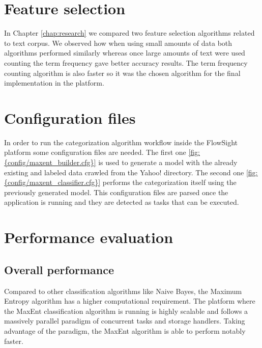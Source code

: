   

\section{Feature selection}
In Chapter \ref{chap:research} we compared two feature selection algorithms related to text corpus. We observed how when using small amounts of data both algorithms performed similarly whereas once
large amounts of text were used counting the term frequency gave better accuracy results. The term frequency counting algorithm is also faster so it was the chosen algorithm for the final 
implementation in the platform.


\section{Configuration files}
\label{sec:config}
In order to run the categorization algorithm workflow inside the FlowSight platform some configuration files are needed. The first one \ref{fig:{config/maxent_builder.cfg}} is used to generate a model with the already existing and labeled
data crawled from the Yahoo! directory. The second one \ref{fig:{config/maxent_classifier.cfg}} performs the categorization itself using the previously generated model. This configuration files are
parsed once the application is running and they are detected as tasks that can be executed.



\clearpage
{}

\section{Performance evaluation}
\subsection{Overall performance}
Compared to other classification algorithms like Naive Bayes, the Maximum Entropy algorithm has a higher computational requirement. 
The platform where the MaxEnt classification algorithm is running is highly scalable and follows a massively parallel paradigm of concurrent tasks and storage handlers. 
Taking advantage of the paradigm, the MaxEnt algorithm is able to perform notably faster.


